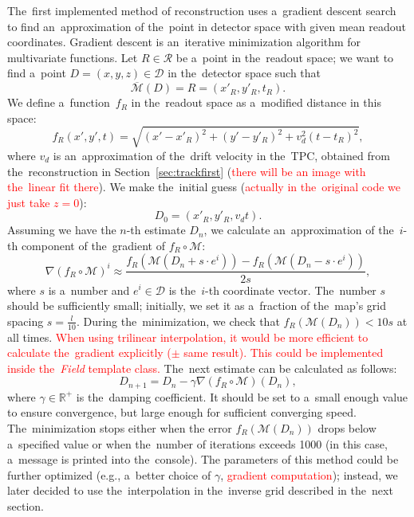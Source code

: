 			The~first implemented method of reconstruction uses a~gradient descent search to find an~approximation of the~point in detector space with given mean readout coordinates. Gradient descent is an~iterative minimization algorithm for multivariate functions. Let $R\in\mathcal{R}$ be a~point in the~readout space; we want to find a~point $D = (x,y,z) \in\mathcal{D}$ in the~detector space such that 
				\begin{equation}
					\overbar{\mathcal{M}}(D) = R = (x'_R,y'_R,t_R).
				\end{equation}
			We define a~function~$f_R$ in the~readout space as a~modified distance in this space:
				\begin{equation}
					f_R(x',y',t) = \sqrt{(x'-x'_R)^2+(y'-y'_R)^2+v_d^2(t-t_R)^2},
				\end{equation}
			where $v_d$ is an~approximation of the~drift velocity in the~\ac{TPC}, obtained from the~reconstruction in Section~\ref{sec:trackfirst} (\textcolor{red}{there will be an image with the~linear fit there}). We make the~initial guess (\textcolor{red}{actually in the~original code we just take $z=0$}):
				\begin{equation}
					D_0 = (x'_R,y'_R,v_dt).
				\end{equation}
			Assuming we have the $n$-th estimate $D_n$, we calculate an~approximation of the~$i$-th component of the~gradient of $f_R\circ\mathcal{M}$:
				\begin{equation}
					\nabla(f_R\circ\mathcal{M})^i \approx \frac{f_R(\mathcal{M}(D_n+s\cdot e^i))-f_R(\mathcal{M}(D_n-s\cdot e^i))}{2s},
				\end{equation}
			where $s$ is a~number and $e^i\in\mathcal{D}$ is the~$i$-th coordinate vector. The~number $s$ should be sufficiently small; initially, we set it as a~fraction of the~map's grid spacing $s = \frac{l}{10}$. During the~minimization, we check that $f_R(\mathcal{M}(D_n))<10s$ at all times. \textcolor{red}{When using trilinear interpolation, it would be more efficient to calculate the~gradient explicitly ($\pm$ same result). This could be implemented inside the~\textit{Field} template class.} The~next estimate can be calculated as follows:
				\begin{equation}
					D_{n+1} = D_n - \gamma \nabla(f_R\circ\mathcal{M})(D_n),
				\end{equation}
			where $\gamma\in\mathbb{R}^+$ is the~damping coefficient. It should be set to a~small enough value to ensure convergence, but large enough for sufficient converging speed. The~minimization stops either when the error $f_R(\mathcal{M}(D_n))$ drops below a~specified value or when the~number of iterations exceeds 1000 (in this case, a~message is printed into the~console).
			The parameters of this method could be further optimized (e.g., a~better choice of $\gamma$, \textcolor{red}{gradient computation}); instead, we later decided to use the~interpolation in the~inverse grid described in the~next section.
			
